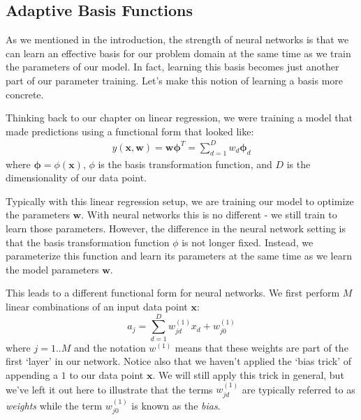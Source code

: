 \subsection{Adaptive Basis Functions}
As we mentioned in the introduction, the strength of neural networks is that we can learn an effective basis for our problem domain at the same time as we train the parameters of our model. In fact, learning this basis becomes just another part of our parameter training. Let's make this notion of learning a basis more concrete.

Thinking back to our chapter on linear regression, we were training a model that made predictions using a functional form that looked like:
\begin{align*}
	y(\textbf{x}, \textbf{w}) = \textbf{w} \boldsymbol{\phi}^{T} = \sum_{d=1}^{D} w_{d} \boldsymbol{\phi}_{d}
\end{align*}
where $\boldsymbol{\phi} = \phi(\textbf{x})$, $\phi$ is the basis transformation function, and $D$ is the dimensionality of our data point.

Typically with this linear regression setup, we are training our model to optimize the parameters $\textbf{w}$. With neural networks this is no different - we still train to learn those parameters. However, the difference in the neural network setting is that the basis transformation function $\phi$ is not longer fixed. Instead, we parameterize this function and learn its parameters at the same time as we learn the model parameters $\textbf{w}$.


This leads to a different functional form for neural networks. We first perform $M$ linear combinations of an input data point $\textbf{x}$:
\begin{equation} \label{basic-nn-form}
	a_{j} = \sum_{d=1}^{D} w_{jd}^{(1)} x_{d} + w_{j0}^{(1)}
\end{equation}
where $j=1..M$ and the notation $w^{(1)}$ means that these weights are part of the first `layer' in our network. Notice also that we haven't applied the `bias trick' of appending a $1$ to our data point $\textbf{x}$. We will still apply this trick in general, but we've left it out here to illustrate that the terms $w_{jd}^{(1)}$ are typically referred to as \textit{weights} while the term $w_{j0}^{(1)}$ is known as the \textit{bias}.

